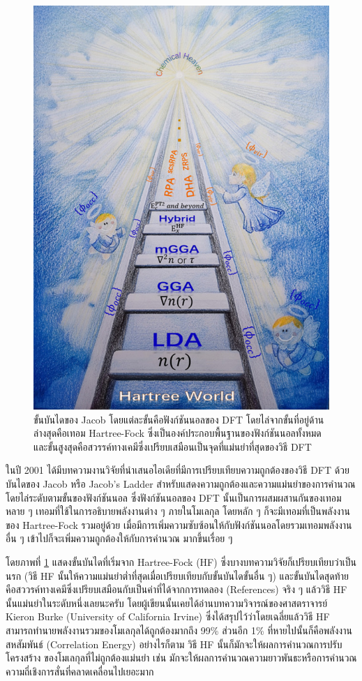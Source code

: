 \begin{figure}[H]
    \centering
    \includegraphics[width=0.8\linewidth]{fig/jacob_ladder.jpg}
    \caption{ขั้นบันไดของ Jacob โดยแต่ละขั้นคือฟังก์ชันนอลของ DFT โดยไล่จากขั้นที่อยู่ด้านล่างสุดคือเทอม Hartree-Fock ซึ่งเป็นองค์ประกอบพื้นฐานของฟังก์ชันนอลทั้งหมดและขั้นสูงสุดคือสวรรค์ทางเคมีซึ่งเปรียบเสมือนเป็นจุดที่แม่นยำที่สุดของวิธี DFT}
    \label{fig:jacob_ladder}
\end{figure}

ในปี 2001 ได้มีบทความงานวิจัยที่นำเสนอไอเดียที่มีการเปรียบเทียบความถูกต้องของวิธี DFT ด้วยบันไดของ Jacob หรือ Jacob's Ladder
สำหรับแสดงความถูกต้องและความแม่นยำของการคำนวณโดยไล่ระดับตามขั้นของฟังก์ชันนอล\autocite{perdew2001} ซึ่งฟังก์ชันนอลของ DFT
นั้นเป็นการผสมผสานกันของเทอมหลาย ๆ เทอมที่ใช้ในการอธิบายพลังงานต่าง ๆ ภายในโมเลกุล โดยหลัก ๆ ก็จะมีเทอมที่เป็นพลังงานของ
Hartree-Fock รวมอยู่ด้วย เมื่อมีการเพิ่มความซับซ้อนให้กับฟังก์ชันนอลโดยรวมเทอมพลังงานอื่น ๆ เข้าไปก็จะเพิ่มความถูกต้องให้กับการคำนวณ%
มากขึ้นเรื่อย ๆ

โดยภาพที่ \ref{fig:jacob_ladder} แสดงขั้นบันไดที่เริ่มจาก Hartree-Fock (HF) ซึ่งบางบทความวิจัยก็เปรียบเทียบว่าเป็นนรก (วิธี HF
นั้นให้ความแม่นยำต่ำที่สุดเมื่อเปรียบเทียบกับขั้นบันไดขั้นอื่น ๆ) และขั้นบันไดสุดท้ายคือสววรค์ทางเคมีซึ่งเปรียบเสมือนกับเป็นค่าที่ได้จากการทดลอง
(References) จริง ๆ แล้ววิธี HF นั้นแม่นยำในระดับหนึ่งเลยนะครับ โดยผู้เขียนนั้นเคยได้อ่านบทความวิจารณ์ของศาสตราจารย์ Kieron Burke
(University of California Irvine) ซึ่งได้สรุปไว้ว่าโดยเฉลี่ยแล้ววิธี HF สามารถทำนายพลังงานรวมของโมเลกุลได้ถูกต้องมากถึง 99\%
ส่วนอีก 1\% ที่หายไปนั้นก็คือพลังงานสหสัมพันธ์ (Correlation Energy) อย่างไรก็ตาม วิธี HF นั้นก็มักจะให้ผลการคำนวณการปรับโครงสร้าง%
ของโมเลกุลที่ไม่ถูกต้องแม่นยำ เช่น มักจะให้ผลการคำนวณความยาวพันธะหรือการคำนวณความถี่เชิงการสั่นที่คลาดเคลื่อนไปเยอะมาก

